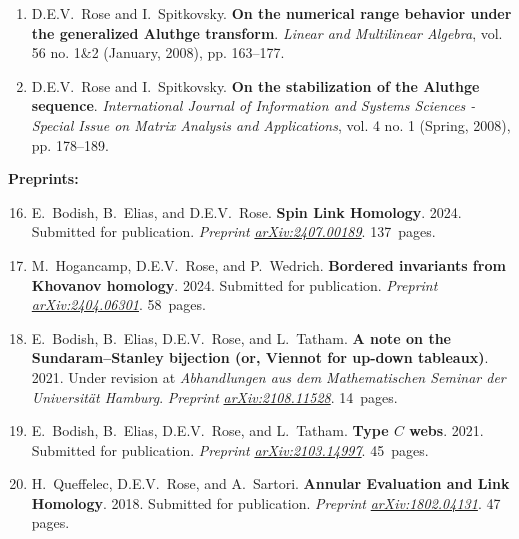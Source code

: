 \documentclass[10pt]{article}
\begin{document}
\begin{enumerate}
\item
D.E.V.~Rose and I.~Spitkovsky.
{\bf On the numerical range behavior under the generalized Aluthge transform}.
\emph{Linear and Multilinear Algebra}, vol. 56 no. 1\&2 (January, 2008), pp. 163--177. %
 
\item 
D.E.V.~Rose and I.~Spitkovsky.
{\bf On the stabilization of the Aluthge sequence}.
\emph{International Journal of Information and Systems Sciences - 
Special Issue on Matrix Analysis and Applications}, 
vol. 4 no. 1 (Spring, 2008), pp. 178--189. %
\end{enumerate}

\noindent\textbf{Preprints:}

\begin{enumerate}
\setcounter{enumi}{15}

\item
E.~Bodish, B.~Elias, and D.E.V.~Rose.
{\bf Spin Link Homology}.
2024.
Submitted for publication.
\emph{Preprint}
\href{http://arxiv.org/abs/2407.00189}{\emph{arXiv:2407.00189}}.
137~pages.

\item
M.~Hogancamp, D.E.V.~Rose, and P.~Wedrich.
{\bf Bordered invariants from Khovanov homology}.
2024.
Submitted for publication.
\emph{Preprint}
\href{http://arxiv.org/abs/2404.06301}{\emph{arXiv:2404.06301}}.
58~pages.

\item
E.~Bodish\textsuperscript{\textdagger}, B.~Elias, D.E.V.~Rose, and L.~Tatham.
{\bf A note on the Sundaram--Stanley bijection (or, Viennot for up-down tableaux)}.
2021.
Under revision at \emph{Abhandlungen aus dem Mathematischen Seminar der Universit\"{a}t Hamburg}.
\emph{Preprint} 
\href{http://arxiv.org/abs/2108.11528}{\emph{arXiv:2108.11528}}.
14~pages.

\item 
E.~Bodish\textsuperscript{\textdagger}, B.~Elias, D.E.V.~Rose, and L.~Tatham\textsuperscript{\textdagger}.
{\bf Type $C$ webs}.
2021.
Submitted for publication.
\emph{Preprint}
\href{http://arxiv.org/abs/2103.14997}{\emph{arXiv:2103.14997}}.
45~pages.

\item 
H.~Queffelec, D.E.V.~Rose, and A.~Sartori.
{\bf Annular Evaluation and Link Homology}.
2018.
Submitted for publication.
\emph{Preprint}
\href{http://arxiv.org/abs/1802.04131}{\emph{arXiv:1802.04131}}.
47 pages.

\end{enumerate}
\end{document}
